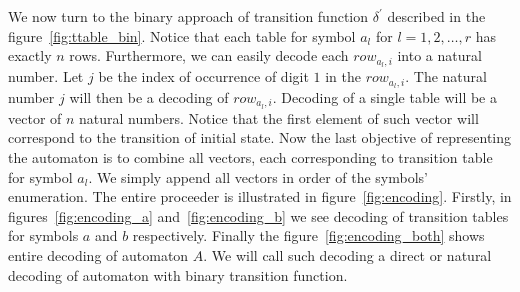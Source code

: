 \documentclass{mini}
\begin{document}
We now turn to the binary approach of transition function $\delta^{'}$ described in the figure~\ref{fig:ttable_bin}. Notice that each table for symbol $a_l$ for $l = 1,2, \dots, r$ has exactly $n$ rows. Furthermore, we can easily decode each $row_{a_l, i}$ into a natural number. Let $j$ be the index of occurrence of digit $1$ in the $row_{a_l, i}$. The natural number $j$ will then be a decoding of $row_{a_l, i}$. Decoding of a single table will be a vector of $n$ natural numbers. Notice that the first element of such vector will correspond to the transition of initial state. Now the last objective of representing the automaton is to combine all vectors, each corresponding to transition table for symbol $a_{l}$. We simply append all vectors in order of the symbols' enumeration. The entire proceeder is illustrated in figure~\ref{fig:encoding}. Firstly, in figures~\ref{fig:encoding_a} and~\ref{fig:encoding_b} we see decoding of transition tables for symbols $a$ and $b$ respectively. Finally the figure~\ref{fig:encoding_both} shows entire decoding of automaton $A$. We will call such decoding a direct or natural decoding of automaton with binary transition function.
\end{document}
